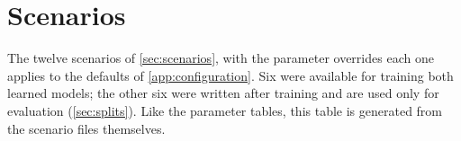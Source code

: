 \chapter{Scenarios}
\label{app:scenarios}

The twelve scenarios of \cref{sec:scenarios}, with the parameter overrides each one applies to the
defaults of \cref{app:configuration}. Six were available for training both learned models; the
other six were written after training and are used only for evaluation
(\cref{sec:splits}). Like the parameter tables, this table is generated from the scenario files
themselves.


